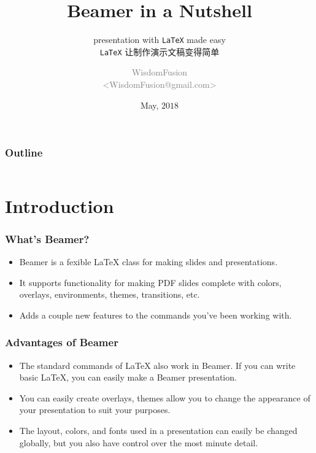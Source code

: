 \documentclass[aspectratio=169,utf8]{ctexbeamer}
\title[Beamer Tutorial]{Beamer in a Nutshell}
\subtitle{presentation with \texttt{\LaTeX} made easy\\ \texttt{\LaTeX} 让制作演示文稿变得简单}
\author[WisdomFusion]{\scriptsize \textcolor{gray}{WisdomFusion\\ <WisdomFusion@gmail.com>}}
\date{May, $2018$}
\begin{document}
\addtocounter{framenumber}{-1}


\begin{frame}
  \titlepage
\end{frame}

\begin{frame}
  \frametitle{Outline}

  \centering

  \begin{minipage}{.75\textwidth}

    \begin{columns}[t]
      \begin{column}{.5\textwidth}
        \tableofcontents[sections={1-5}]
      \end{column}
      \begin{column}{.5\textwidth}
        \tableofcontents[sections={6-10}]
      \end{column}      
    \end{columns}

  \end{minipage}

\end{frame}


\section{Introduction}

\begin{frame}
  \frametitle{What's Beamer?}

  \begin{itemize}
    \setlength{\itemsep}{8pt}
    \item Beamer is a fexible \LaTeX{} class for making slides and presentations.
    \item It supports functionality for making PDF slides complete with colors, overlays, environments, themes, transitions, etc.
    \item Adds a couple new features to the commands you've been working with.
  \end{itemize}
  
\end{frame}


\begin{frame}
  \frametitle{Advantages of Beamer}

  \begin{itemize}
    \setlength{\itemsep}{8pt}
    \item The standard commands of \LaTeX{} also work in Beamer. If you can write basic \LaTeX{}, you can easily make a Beamer presentation.
    \item You can easily create overlays, themes allow you to change the appearance of your presentation to suit your purposes.
    \item The layout, colors, and fonts used in a presentation can easily be changed globally, but you also have control over the most minute detail.
  \end{itemize}
  
\end{frame}
\end{document}
